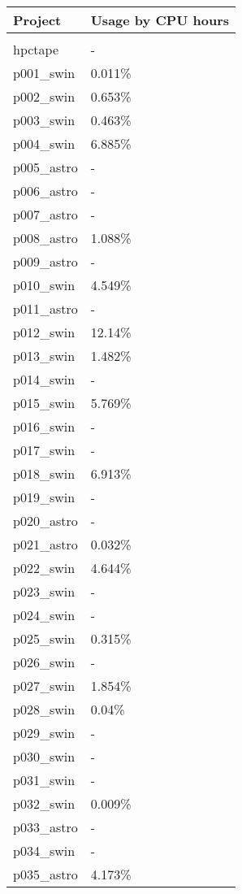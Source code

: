 \documentclass{article}%
\begin{document}
%
\begin{longtabu}{X[l] X[r]}%
\textbf{Project}&\textbf{Usage by CPU hours}\\%
\hline%
&\\%
hpctape&{-}\\%
\hline%
p001\_swin&0.011\%\\%
\hline%
p002\_swin&0.653\%\\%
\hline%
p003\_swin&0.463\%\\%
\hline%
p004\_swin&6.885\%\\%
\hline%
p005\_astro&{-}\\%
\hline%
p006\_astro&{-}\\%
\hline%
p007\_astro&{-}\\%
\hline%
p008\_astro&1.088\%\\%
\hline%
p009\_astro&{-}\\%
\hline%
p010\_swin&4.549\%\\%
\hline%
p011\_astro&{-}\\%
\hline%
p012\_swin&12.14\%\\%
\hline%
p013\_swin&1.482\%\\%
\hline%
p014\_swin&{-}\\%
\hline%
p015\_swin&5.769\%\\%
\hline%
p016\_swin&{-}\\%
\hline%
p017\_swin&{-}\\%
\hline%
p018\_swin&6.913\%\\%
\hline%
p019\_swin&{-}\\%
\hline%
p020\_astro&{-}\\%
\hline%
p021\_astro&0.032\%\\%
\hline%
p022\_swin&4.644\%\\%
\hline%
p023\_swin&{-}\\%
\hline%
p024\_swin&{-}\\%
\hline%
p025\_swin&0.315\%\\%
\hline%
p026\_swin&{-}\\%
\hline%
p027\_swin&1.854\%\\%
\hline%
p028\_swin&0.04\%\\%
\hline%
p029\_swin&{-}\\%
\hline%
p030\_swin&{-}\\%
\hline%
p031\_swin&{-}\\%
\hline%
p032\_swin&0.009\%\\%
\hline%
p033\_astro&{-}\\%
\hline%
p034\_swin&{-}\\%
\hline%
p035\_astro&4.173\%\\%

\end{longtabu}
\end{document}
